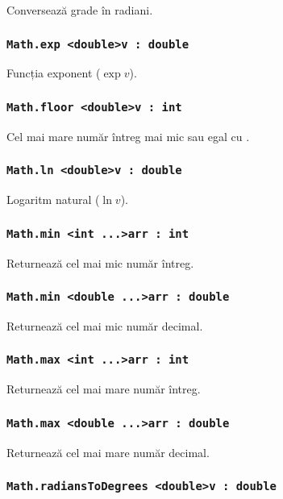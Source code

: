 Conversează grade în radiani.

\subsubsection{\lstinline|Math.exp <double>v : double|}

Funcția exponent ($\exp{v}$).

\subsubsection{\lstinline|Math.floor <double>v : int|}

Cel mai mare număr întreg mai mic sau egal cu .

\subsubsection{\lstinline|Math.ln <double>v : double|}

Logaritm natural ($\ln{v}$).

\subsubsection{\lstinline|Math.min <int ...>arr : int|}

Returnează cel mai mic număr întreg.

\subsubsection{\lstinline|Math.min <double ...>arr : double|}

Returnează cel mai mic număr decimal.

\subsubsection{\lstinline|Math.max <int ...>arr : int|}

Returnează cel mai mare număr întreg.

\subsubsection{\lstinline|Math.max <double ...>arr : double|}

Returnează cel mai mare număr decimal.

\subsubsection{\lstinline|Math.radiansToDegrees <double>v : double|}

